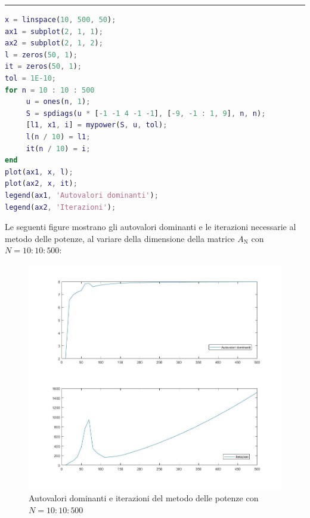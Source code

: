 \hspace*{\fill}
\par\noindent\rule{\textwidth}{0.4pt}
\hspace*{\fill}
\begin{lstlisting}[language=Matlab, caption=Codice Matlab]
x = linspace(10, 500, 50);
ax1 = subplot(2, 1, 1);
ax2 = subplot(2, 1, 2);
l = zeros(50, 1);
it = zeros(50, 1);
tol = 1E-10;
for n = 10 : 10 : 500
     u = ones(n, 1);
     S = spdiags(u * [-1 -1 4 -1 -1], [-9, -1 : 1, 9], n, n);
     [l1, x1, i] = mypower(S, u, tol);
     l(n / 10) = l1;
     it(n / 10) = i;
end
plot(ax1, x, l);
plot(ax2, x, it);
legend(ax1, 'Autovalori dominanti');
legend(ax2, 'Iterazioni');
\end{lstlisting}
Le seguenti figure mostrano gli autovalori dominanti e le iterazioni necessarie al metodo delle potenze, al variare della dimensione della matrice  $A_\mathrm{N}$ con $N = 10 : 10 : 500$:
\begin{figure}[H]
     \includegraphics[width=\textwidth]{Chapter-6/Exercise-25/plot.jpg}
     \caption*{Autovalori dominanti e iterazioni del metodo delle potenze con $N = 10 : 10 : 500$}
\end{figure}
